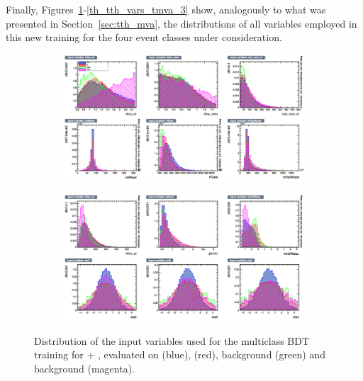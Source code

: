 Finally, Figures~\ref{th_tth_vars_tmva_1}-\ref{th_tth_vars_tmva_3} show, analogously to what was presented in Section~\ref{sec:tth_mva}, the distributions of all variables employed in this new training for the four event classes under consideration.

\begin{figure}[htbp]
  \centering
  \begin{subfigure}{0.95\linewidth}
    \centering
    \includegraphics[width=\linewidth]{images/plots_tH_tHqb_for_thesis/variables_id_c1.png}
  \end{subfigure}
  \vspace{0.5cm} %
  \begin{subfigure}{0.95\linewidth}
    \centering
    \includegraphics[width=\linewidth]{images/plots_tH_tHqb_for_thesis/variables_id_c2.png}
  \end{subfigure}
  \caption{Distribution of the input variables used for the multiclass BDT training for \thtt + \ttHtt, evaluated on \ttHtt (blue), \thtt (red), \ztautau background (green) and \ttbar background (magenta).}
  \label{th_tth_vars_tmva_1}
  \end{figure}

